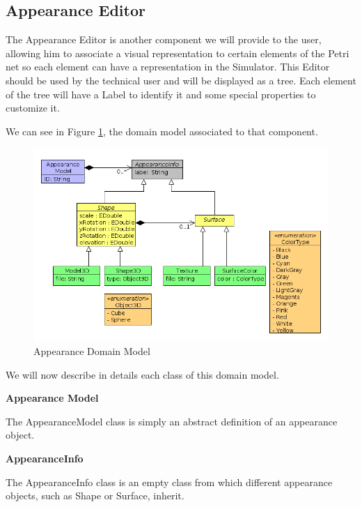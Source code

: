 \subsection{Appearance Editor}
The Appearance Editor is another component we will provide to the user, allowing him to associate a visual representation to certain elements of the Petri net so each element can have a representation in the Simulator. This Editor should be used by the technical user and will be displayed as a tree. Each element of the tree will have a Label to identify it and some special properties to customize it.

We can see in Figure \ref{fig:appearance_domain_model}, the domain model associated to that component.

\begin{figure}[ht]
   \begin{center}
       \includegraphics[scale=0.50]{image/dm_appearance.png}
       \caption{Appearance Domain Model}
       \label{fig:appearance_domain_model}
   \end{center}
\end{figure}

We will now describe in details each class of this domain model.

\textbf{Appearance Model}

The AppearanceModel class is simply an abstract definition of an appearance object. 

\textbf{AppearanceInfo}

The AppearanceInfo class is an empty class from which different appearance objects, such as Shape or Surface, inherit. 

